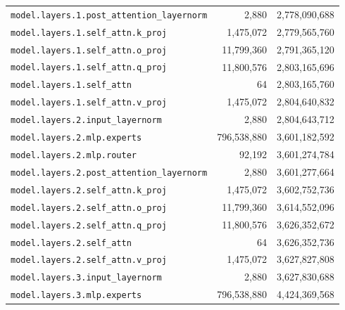 \documentclass[10pt,a4paper]{article}
\theoremstyle{definition}
\begin{document}
\begin{appendices}
\begin{longtable}{p{9.5cm}rr}
\texttt{model.\allowbreak{}layers.\allowbreak{}1.\allowbreak{}post\_attention\_layernorm} & 2,880 & 2,778,090,688 \\
\texttt{model.\allowbreak{}layers.\allowbreak{}1.\allowbreak{}self\_attn.\allowbreak{}k\_proj} & 1,475,072 & 2,779,565,760 \\
\texttt{model.\allowbreak{}layers.\allowbreak{}1.\allowbreak{}self\_attn.\allowbreak{}o\_proj} & 11,799,360 & 2,791,365,120 \\
\texttt{model.\allowbreak{}layers.\allowbreak{}1.\allowbreak{}self\_attn.\allowbreak{}q\_proj} & 11,800,576 & 2,803,165,696 \\
\texttt{model.\allowbreak{}layers.\allowbreak{}1.\allowbreak{}self\_attn} & 64 & 2,803,165,760 \\
\texttt{model.\allowbreak{}layers.\allowbreak{}1.\allowbreak{}self\_attn.\allowbreak{}v\_proj} & 1,475,072 & 2,804,640,832 \\
\texttt{model.\allowbreak{}layers.\allowbreak{}2.\allowbreak{}input\_layernorm} & 2,880 & 2,804,643,712 \\
\texttt{model.\allowbreak{}layers.\allowbreak{}2.\allowbreak{}mlp.\allowbreak{}experts} & 796,538,880 & 3,601,182,592 \\
\texttt{model.\allowbreak{}layers.\allowbreak{}2.\allowbreak{}mlp.\allowbreak{}router} & 92,192 & 3,601,274,784 \\
\texttt{model.\allowbreak{}layers.\allowbreak{}2.\allowbreak{}post\_attention\_layernorm} & 2,880 & 3,601,277,664 \\
\texttt{model.\allowbreak{}layers.\allowbreak{}2.\allowbreak{}self\_attn.\allowbreak{}k\_proj} & 1,475,072 & 3,602,752,736 \\
\texttt{model.\allowbreak{}layers.\allowbreak{}2.\allowbreak{}self\_attn.\allowbreak{}o\_proj} & 11,799,360 & 3,614,552,096 \\
\texttt{model.\allowbreak{}layers.\allowbreak{}2.\allowbreak{}self\_attn.\allowbreak{}q\_proj} & 11,800,576 & 3,626,352,672 \\
\texttt{model.\allowbreak{}layers.\allowbreak{}2.\allowbreak{}self\_attn} & 64 & 3,626,352,736 \\
\texttt{model.\allowbreak{}layers.\allowbreak{}2.\allowbreak{}self\_attn.\allowbreak{}v\_proj} & 1,475,072 & 3,627,827,808 \\
\texttt{model.\allowbreak{}layers.\allowbreak{}3.\allowbreak{}input\_layernorm} & 2,880 & 3,627,830,688 \\
\texttt{model.\allowbreak{}layers.\allowbreak{}3.\allowbreak{}mlp.\allowbreak{}experts} & 796,538,880 & 4,424,369,568 \\

\end{longtable}
\end{appendices}
\end{document}
